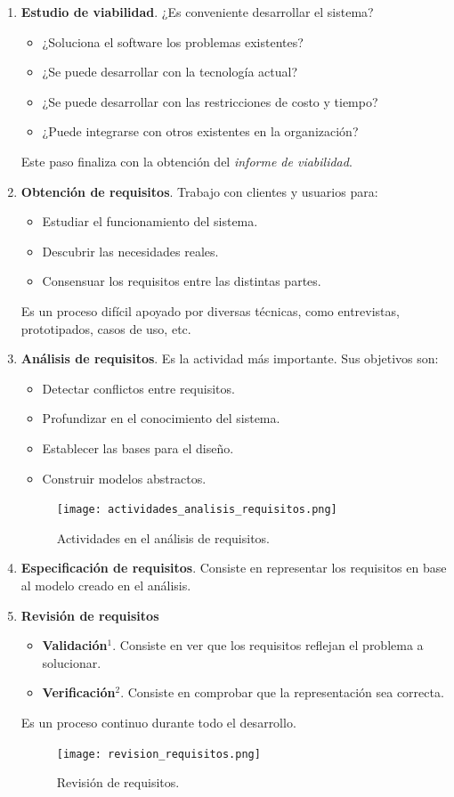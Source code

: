 \documentclass[12pt,spanish]{article}
\begin{document}
\begin{enumerate}
	\item \textbf{Estudio de viabilidad}. ¿Es conveniente desarrollar el sistema?
		\begin{itemize}
			\item ¿Soluciona el software los problemas existentes?
			\item ¿Se puede desarrollar con la tecnología actual?
			\item ¿Se puede desarrollar con las restricciones de costo y tiempo?
			\item ¿Puede integrarse con otros existentes en la organización?
		\end{itemize}
		Este paso finaliza con la obtención del \emph{informe de viabilidad}.
	\item \textbf{Obtención de requisitos}. Trabajo con clientes y usuarios para:
		\begin{itemize}
			\item Estudiar el funcionamiento del sistema.
			\item Descubrir las necesidades reales.
			\item Consensuar los requisitos entre las distintas partes.
		\end{itemize}
		Es un proceso difícil apoyado por diversas técnicas, como entrevistas, prototipados, casos de uso, etc. 
		\item \textbf{Análisis de requisitos}. Es la actividad más importante. Sus objetivos son:
			\begin{itemize}
				\item Detectar conflictos entre requisitos.
				\item Profundizar en el conocimiento del sistema.
				\item Establecer las bases para el diseño.
				\item Construir modelos abstractos.
			\end{itemize}
			\begin{figure}[H]
				\centering
				\texttt{[image: actividades\_analisis\_requisitos.png]}
				\caption{Actividades en el análisis de requisitos.}
			\end{figure}
		\item \textbf{Especificación de requisitos}. Consiste en representar los requisitos en base al modelo creado en el análisis.
		\newpage
		\item \textbf{Revisión de requisitos}
			\begin{itemize}
				\item \textbf{Validación}$^1$. Consiste en ver que los requisitos reflejan el problema a solucionar.
				\item \textbf{Verificación}$^2$. Consiste en comprobar que la representación sea correcta.
			\end{itemize}
			Es un proceso continuo durante todo el desarrollo.
			\begin{figure}[H]
				\centering
				\texttt{[image: revision\_requisitos.png]}
				\caption{Revisión de requisitos.}
			\end{figure}
\end{enumerate}
\end{document}
